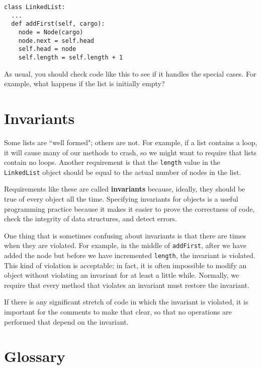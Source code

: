 \beforeverb
\begin{verbatim}
class LinkedList:
  ...
  def addFirst(self, cargo):
    node = Node(cargo)
    node.next = self.head
    self.head = node
    self.length = self.length + 1
\end{verbatim}
\afterverb
%
As usual, you should check code like this to see if it handles
the special cases.  For example, what happens if the list is initially
empty?


\section {Invariants}

Some lists are ``well formed"; others are not.  For example, if a list
contains a loop, it will cause many of our methods to crash, so we
might want to require that lists contain no loops.  Another
requirement is that the {\tt length} value in the {\tt LinkedList}
object should be equal to the actual number of nodes in the list.

Requirements like these are called {\bf invariants} because, ideally,
they should be true of every object all the time.  Specifying
invariants for objects is a useful programming practice because it
makes it easier to prove the correctness of code, check the integrity
of data structures, and detect errors.

One thing that is sometimes confusing about invariants is that
there are times when they are violated.  For example, in the
middle of {\tt addFirst}, after we have added the node but
before we have incremented {\tt length}, the invariant is
violated.  This kind of violation is acceptable; in fact, it is
often impossible to modify an object without violating an
invariant for at least a little while.  Normally, we require
that every method that violates an invariant must restore
the invariant.

If there is any significant stretch of code in which the invariant
is violated, it is important for the comments to make that clear,
so that no operations are performed that depend on the invariant.



\section{Glossary}

